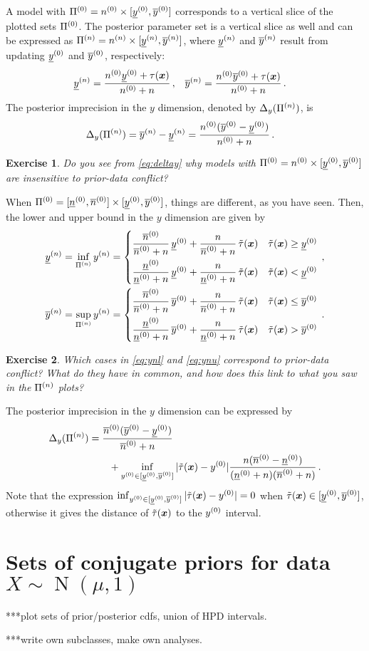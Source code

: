 \documentclass[12pt,a4paper	,twoside]{article}
\newcommand{\bs}[1]{\boldsymbol{#1}}
\renewcommand{\vec}[1]{{\bs#1}}
\newcommand{\norm}{\operatorname{N}}
\newtheorem{myex}{Exercise}
\begin{document}
A model with $\Pi^{(0)} = n^{(0)} \times [\underline{y}^{(0)}, \overline{y}^{(0)}]$ corresponds to a vertical slice of the plotted sets $\Pi^{(0)}$.
The posterior parameter set is a vertical slice as well and can be expressed as $\Pi^{(n)} = n^{(n)} \times [\underline{y}^{(n)}, \overline{y}^{(n)}]$,
where $\underline{y}^{(n)}$ and $\overline{y}^{(n)}$ result from updating $\underline{y}^{(0)}$ and $\overline{y}^{(0)}$, respectively:
\begin{align}
\ynl &= \frac{\nz\yzl + \tau(\vec{x})}{\nz + n}\,, &
\ynu &= \frac{\nz\yzu + \tau(\vec{x})}{\nz + n}\,.
\end{align}
The posterior imprecision in the $y$ dimension, denoted by $\Delta_y(\Pi^{(n)})$, is 
\begin{align}
\label{eq:deltay}
\Delta_y(\Pi^{(n)}) &= \overline{y}^{(n)} - \underline{y}^{(n)} = \frac{n^{(0)} (\overline{y}^{(0)} - \underline{y}^{(0)})}{n^{(0)} +n}\,.
\end{align}
\begin{myex}
Do you see from \eqref{eq:deltay} why models with $\Pi^{(0)} = n^{(0)} \times [\underline{y}^{(0)}, \overline{y}^{(0)}]$ are insensitive to prior-data conflict?
\end{myex}
When $\Pi^{(0)} = [\underline{n}^{(0)}, \overline{n}^{(0)}] \times [\underline{y}^{(0)}, \overline{y}^{(0)}]$, things are different, as you have seen.
Then, the lower and upper bound in the $y$ dimension are given by
\begin{align}
\label{eq:ynl}
\ynl &= \inf_{\PN} \yn = \begin{cases} \dfrac{\nzu}{\nzu + n}\,\yzl + \dfrac{n}{\nzu + n}\,\ttaux & \ttaux \geq \yzl \\[2ex]
                                       \dfrac{\nzl}{\nzl + n}\,\yzl + \dfrac{n}{\nzl + n}\,\ttaux & \ttaux <    \yzl \end{cases}\,,\\
\label{eq:ynu}
\ynu &= \sup_{\PN} \yn = \begin{cases} \dfrac{\nzu}{\nzu + n}\,\yzu + \dfrac{n}{\nzu + n}\,\ttaux & \ttaux \leq \yzu \\[2ex]
                                       \dfrac{\nzl}{\nzl + n}\,\yzu + \dfrac{n}{\nzl + n}\,\ttaux & \ttaux >    \yzu \end{cases}\,.
\end{align}
\begin{myex}
Which cases in \eqref{eq:ynl} and \eqref{eq:ynu} correspond to prior-data conflict?
What do they have in common, and how does this link to what you saw in the $\Pi^{(n)}$ plots?
\end{myex}
The posterior imprecision in the $y$ dimension can be expressed by
\begin{align}
\Delta_y(\PN) &= \frac{\nzu (\yzu - \yzl)}{\nzu + n}\\
              &\qquad + \inf_{\yz \in [\yzl,\yzu]} |\ttaux - \yz| \frac{n (\nzu - \nzl)}{(\nzl + n)(\nzu + n)}\,.
\end{align}
Note that the expression $\inf_{\yz \in [\yzl,\yzu]} |\ttaux - \yz| = 0$ when $\ttaux \in [\yzl, \yzu]$,
otherwise it gives the distance of $\ttaux$ to the $y^{(0)}$ interval.


\section{Sets of conjugate priors for data $X \sim \norm(\mu,1)$}

***plot sets of prior/posterior cdfs, union of HPD intervals.

***write own subclasses, make own analyses.




\printbibliography
\end{document}
